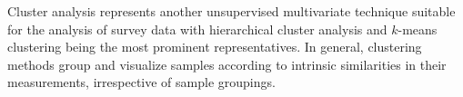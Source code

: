 Cluster analysis represents another unsupervised multivariate technique suitable for the analysis of survey data with hierarchical cluster analysis and $k$-means clustering being the most prominent representatives. In general, clustering methods group and visualize samples according to intrinsic similarities in their measurements, irrespective of sample groupings. 
